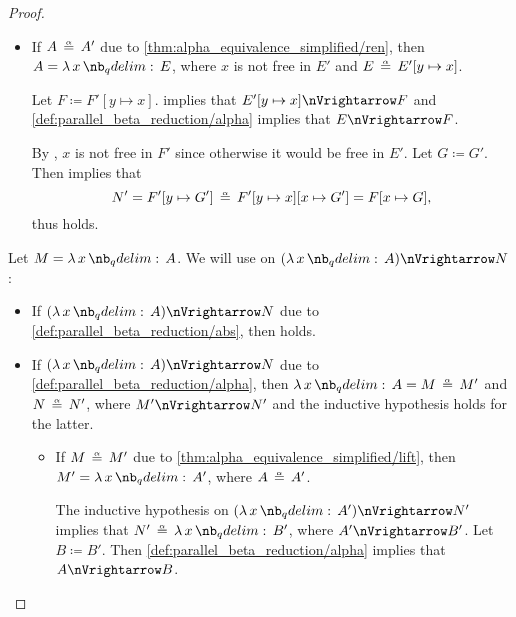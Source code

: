\begin{proof}
\begin{itemize}
\begin{itemize}
\begin{itemize}
        \item If \( A \aequiv A' \) due to \ref{thm:alpha_equivalence_simplified/ren}, then \( A = \qabs x E \), where \( x \) is not free in \( E' \) and \( E \aequiv E'[y \mapsto x] \).

        Let \( F \coloneqq F'[y \mapsto x] \).  implies that \( E'[y \mapsto x] \pred F \) and \ref{def:parallel_beta_reduction/alpha} implies that \( E \pred F \).

        By , \( x \) is not free in \( F' \) since otherwise it would be free in \( E' \). Let \( G \coloneqq G' \). Then  implies that
        \begin{equation*}
          N'
          =
          F'[y \mapsto G']
          \aequiv
          F'[y \mapsto x][x \mapsto G']
          =
          F[x \mapsto G],
        \end{equation*}
        thus  holds.
      \end{itemize}
    \end{itemize}
  \end{itemize}

   Let \( M = \qabs x A \). We will use  on \( (\qabs x A) \pred N \):
  \begin{itemize}
    \item If \( (\qabs x A) \pred N \) due to \ref{def:parallel_beta_reduction/abs}, then  holds.

    \item If \( (\qabs x A) \pred N \) due to \ref{def:parallel_beta_reduction/alpha}, then \( \qabs x A = M \aequiv M' \) and \( N \aequiv N' \), where \( M' \pred N' \) and the inductive hypothesis holds for the latter.

    \begin{itemize}
      \item If \( M \aequiv M' \) due to \ref{thm:alpha_equivalence_simplified/lift}, then \( M' = \qabs x A' \), where \( A \aequiv A' \).

      The inductive hypothesis on \( (\qabs x A') \pred N' \) implies that \( N' \aequiv \qabs x B' \), where \( A' \pred B' \). Let \( B \coloneqq B' \). Then \ref{def:parallel_beta_reduction/alpha} implies that \( A \pred B \).


\end{itemize}
\end{itemize}
\end{proof}
